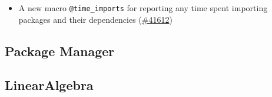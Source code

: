 \begin{itemize}
\item A new macro \texttt{@time\_imports} for reporting any time spent importing packages and their dependencies (\href{https://github.com/JuliaLang/julia/issues/41612}{\#41612})

\end{itemize}


\hypertarget{11746884955550476831}{}


\subsection{Package Manager}



\hypertarget{5352389965411431652}{}


\subsection{LinearAlgebra}



